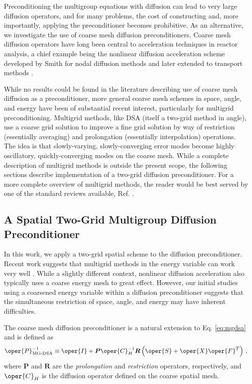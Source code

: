 Preconditioning the multigroup equations with diffusion can lead to 
very large diffusion operators, and for many problems, the cost of 
constructing and, more importantly, applying the preconditioner becomes
prohibitive.  As an alternative, we investigate the use of coarse mesh
diffusion preconditioners.  Coarse mesh diffusion operators have long been
central to acceleration techniques in reactor analysis, a chief 
example being the nonlinear diffusion acceleration scheme developed
by Smith \cite{smith1983nms} for nodal diffusion methods and later
extended to transport methods \cite{smith2002fct}.  

While no results could be found in the literature describing use of 
coarse mesh diffusion as a preconditioner, more general coarse mesh 
schemes in space, angle, and energy have been of substantial recent 
interest, particularly for multigrid preconditioning.  
Multigrid methods, like DSA (itself a two-grid method in angle), use 
a coarse grid solution to improve a fine grid solution by way of 
restriction (essentially averaging) and prolongation (essentially
interpolation) operations.  The idea is that slowly-varying, 
slowly-converging error modes become highly oscillatory, quickly-converging 
modes on the coarse mesh. While a complete description of multigrid 
methods is outside the present scope, the following sections describe 
implementation of a two-grid diffusion preconditioner.  For a more 
complete overview of multigrid methods, the reader would be best 
served by one of the standard reviews 
available, \eg Ref. \cite{briggs2000amt}.  

\subsection{A Spatial Two-Grid Multigroup Diffusion Preconditioner}

In this work, we apply a two-grid spatial scheme to the diffusion 
preconditioner.  Recent 
work suggests that multigrid methods in the energy variable can work very 
well \cite{slaybaugh2013mep}.  While a slightly different
context, nonlinear diffusion acceleration also typically uses a coarse 
energy mesh to great effect. However, our initial studies using a coarsened
energy variable within a diffusion preconditioner suggests that the 
simultaneous restriction of space, angle, and energy may have inherent 
difficulties.

The coarse mesh diffusion preconditioner is a natural extension 
to Eq. \ref{eq:mgdsa} and is defined as
\begin{equation}
   \oper{P}^{-1}_{\text{MG-DSA}} \equiv 
    \oper{I} + \bm{P}\oper{C}_H^{-1}\bm{R}
     \left(\oper{S} + \oper{X}\oper{F}^T\right) \, ,
\end{equation}
where $\bm{P}$ and $\bm{R}$ are the \emph{ prolongation} and 
\emph{ restriction} operators, respectively, and 
$\oper{C}_H$ is the diffusion operator defined on the coarse 
spatial mesh.  

